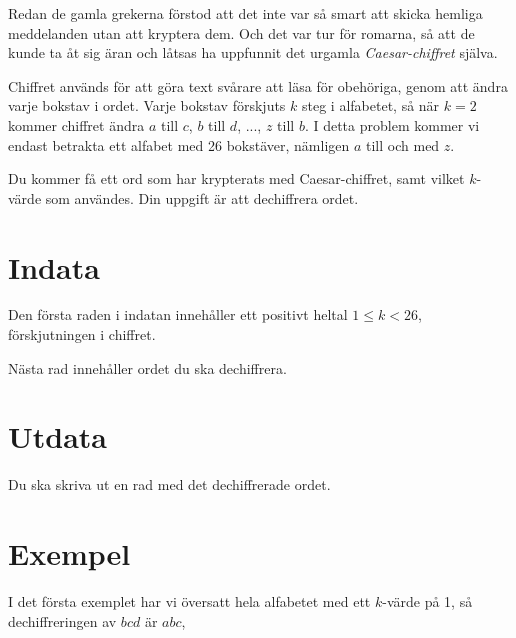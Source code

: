 
Redan de gamla grekerna förstod att det inte var så smart att skicka hemliga meddelanden utan att kryptera dem. Och det var tur för romarna, så att de kunde ta åt sig äran och låtsas ha uppfunnit det urgamla \emph{Caesar-chiffret} själva.

Chiffret används för att göra text svårare att läsa för obehöriga, genom att ändra varje bokstav i ordet. Varje bokstav förskjuts $k$ steg i alfabetet, så när $k = 2$ kommer chiffret ändra $a$ till $c$, $b$ till $d$, ..., $z $ till $b$. I detta problem kommer vi endast betrakta ett alfabet med 26 bokstäver, nämligen $a$ till och med $z$.

Du kommer få ett ord som har krypterats med Caesar-chiffret, samt vilket $k$-värde som användes. Din uppgift är att dechiffrera ordet.

\section*{Indata}
Den första raden i indatan innehåller ett positivt heltal $1 \le k < 26$, förskjutningen i chiffret.

Nästa rad innehåller ordet du ska dechiffrera.

\section*{Utdata}
Du ska skriva ut en rad med det dechiffrerade ordet.

\section*{Exempel}
I det första exemplet har vi översatt hela alfabetet med ett $k$-värde på 1, så dechiffreringen av $bcd$ är $abc$,
